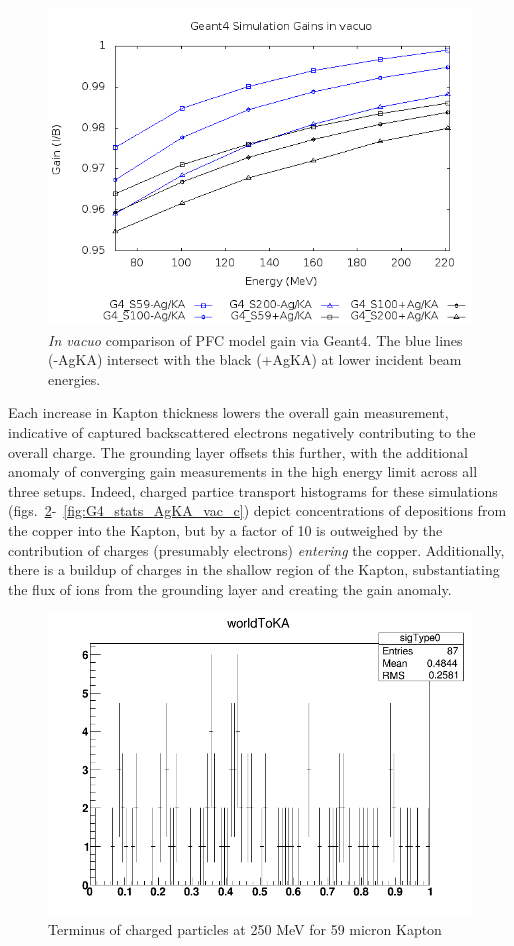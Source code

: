 \documentclass{article}
\begin{document}
\begin{figure}[H]
  \centering
  \includegraphics[width=5in]{figures/fig_G4_results_vac.png}
  \caption{\emph{In vacuo} comparison of PFC model gain via Geant4.  The blue lines (-AgKA) intersect with the black (+AgKA) at lower incident beam energies.} 
  \label{fig:G4_results_vac}
\end{figure}

Each increase in Kapton thickness lowers the overall gain measurement, indicative of captured backscattered electrons negatively contributing to the overall charge.  The grounding layer offsets this further, with the additional anomaly of converging gain measurements in the high energy limit across all three setups.  Indeed, charged partice transport histograms for these simulations (figs.~\ref{fig:G4_stats_vac_a}-~\ref{fig:G4_stats_AgKA_vac_c}) depict concentrations of depositions from the copper into the Kapton, but by a factor of 10 is outweighed by the contribution of charges (presumably electrons) \emph{entering} the copper.  Additionally, there is a buildup of charges in the shallow region of the Kapton, substantiating the flux of ions from the grounding layer and creating the gain anomaly.

\begin{figure}[H]
\centering
\includegraphics[width=6in]{figures/Cu_KA_vac/S59/WorldtoKA.png}
\caption{Terminus of charged particles at 250 MeV for 59 micron Kapton}
\label{fig:G4_stats_vac_a}
\end{figure}
\end{document}
